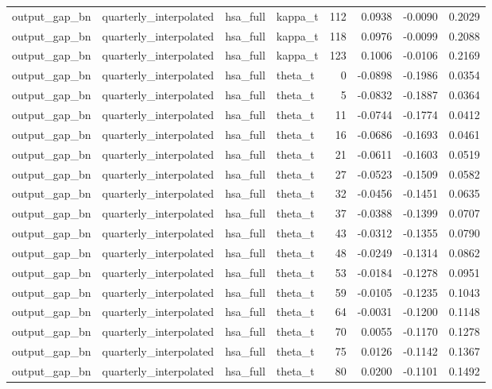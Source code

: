 \begin{tabular}{llllrrrr}
output\_gap\_bn & quarterly\_interpolated & hsa\_full & kappa\_t & 112 & 0.0938 & -0.0090 & 0.2029 \\
output\_gap\_bn & quarterly\_interpolated & hsa\_full & kappa\_t & 118 & 0.0976 & -0.0099 & 0.2088 \\
output\_gap\_bn & quarterly\_interpolated & hsa\_full & kappa\_t & 123 & 0.1006 & -0.0106 & 0.2169 \\
output\_gap\_bn & quarterly\_interpolated & hsa\_full & theta\_t & 0 & -0.0898 & -0.1986 & 0.0354 \\
output\_gap\_bn & quarterly\_interpolated & hsa\_full & theta\_t & 5 & -0.0832 & -0.1887 & 0.0364 \\
output\_gap\_bn & quarterly\_interpolated & hsa\_full & theta\_t & 11 & -0.0744 & -0.1774 & 0.0412 \\
output\_gap\_bn & quarterly\_interpolated & hsa\_full & theta\_t & 16 & -0.0686 & -0.1693 & 0.0461 \\
output\_gap\_bn & quarterly\_interpolated & hsa\_full & theta\_t & 21 & -0.0611 & -0.1603 & 0.0519 \\
output\_gap\_bn & quarterly\_interpolated & hsa\_full & theta\_t & 27 & -0.0523 & -0.1509 & 0.0582 \\
output\_gap\_bn & quarterly\_interpolated & hsa\_full & theta\_t & 32 & -0.0456 & -0.1451 & 0.0635 \\
output\_gap\_bn & quarterly\_interpolated & hsa\_full & theta\_t & 37 & -0.0388 & -0.1399 & 0.0707 \\
output\_gap\_bn & quarterly\_interpolated & hsa\_full & theta\_t & 43 & -0.0312 & -0.1355 & 0.0790 \\
output\_gap\_bn & quarterly\_interpolated & hsa\_full & theta\_t & 48 & -0.0249 & -0.1314 & 0.0862 \\
output\_gap\_bn & quarterly\_interpolated & hsa\_full & theta\_t & 53 & -0.0184 & -0.1278 & 0.0951 \\
output\_gap\_bn & quarterly\_interpolated & hsa\_full & theta\_t & 59 & -0.0105 & -0.1235 & 0.1043 \\
output\_gap\_bn & quarterly\_interpolated & hsa\_full & theta\_t & 64 & -0.0031 & -0.1200 & 0.1148 \\
output\_gap\_bn & quarterly\_interpolated & hsa\_full & theta\_t & 70 & 0.0055 & -0.1170 & 0.1278 \\
output\_gap\_bn & quarterly\_interpolated & hsa\_full & theta\_t & 75 & 0.0126 & -0.1142 & 0.1367 \\
output\_gap\_bn & quarterly\_interpolated & hsa\_full & theta\_t & 80 & 0.0200 & -0.1101 & 0.1492 \\

\end{tabular}
